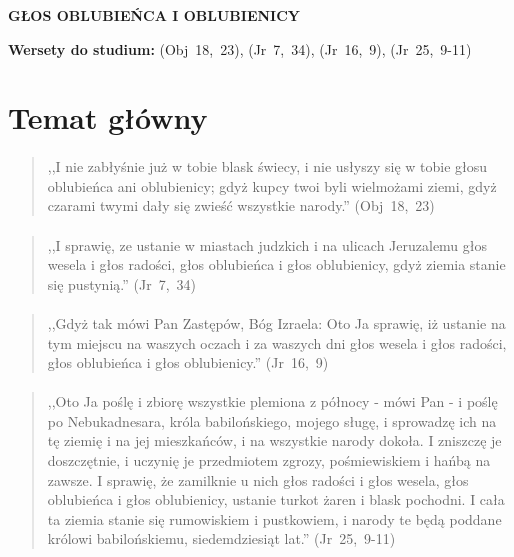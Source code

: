 \documentclass[10pt,a4paper,oneside]{article}
\begin{document}
\centerline{\textbf{\MakeUppercase{Głos Oblubieńca i Oblubienicy}}}
\begin{center}
\textbf{Wersety do studium:} \mbox{(Obj 18, 23)}, \mbox{(Jr 7, 34)}, \mbox{(Jr 16, 9)}, \mbox{(Jr 25, 9-11)}
\end{center}
\section{Temat główny}
\paragraph{}
\begin{quote}
,,I nie zabłyśnie już w tobie blask świecy, i nie usłyszy się w tobie głosu oblubieńca ani oblubienicy; gdyż kupcy twoi byli wielmożami ziemi, gdyż czarami twymi dały się zwieść wszystkie narody.'' \mbox{(Obj 18, 23)}
\end{quote}
\paragraph{}
\begin{quote}
,,I sprawię, ze ustanie w miastach judzkich i na ulicach Jeruzalemu głos wesela i głos radości, głos oblubieńca i głos oblubienicy, gdyż ziemia stanie się pustynią.'' \mbox{(Jr 7, 34)}
\end{quote}
\paragraph{}
\begin{quote}
,,Gdyż tak mówi Pan Zastępów, Bóg Izraela: Oto Ja sprawię, iż ustanie na tym miejscu na waszych oczach i za waszych dni głos wesela i głos radości, głos oblubieńca i głos oblubienicy.'' \mbox{(Jr 16, 9)}
\end{quote}
\paragraph{}
\begin{quote}
,,Oto Ja poślę i zbiorę wszystkie plemiona z północy - mówi Pan - i poślę po Nebukadnesara, króla babilońskiego, mojego sługę, i sprowadzę ich na tę ziemię i na jej mieszkańców, i na wszystkie narody dokoła. I zniszczę je doszczętnie, i uczynię je przedmiotem zgrozy, pośmiewiskiem i hańbą na zawsze. I sprawię, że zamilknie u nich głos radości i głos wesela, głos oblubieńca i głos oblubienicy, ustanie turkot żaren i blask pochodni. I cała ta ziemia stanie się rumowiskiem i pustkowiem, i narody te będą poddane królowi babilońskiemu, siedemdziesiąt lat.'' \mbox{(Jr 25, 9-11)}
\end{quote}
\end{document}
